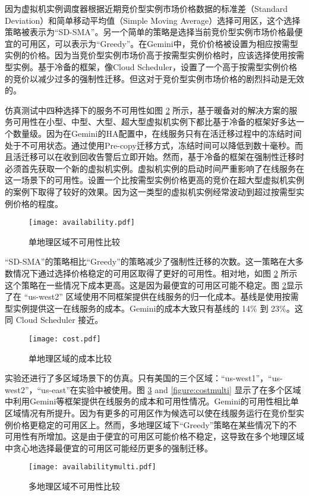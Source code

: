 因为虚拟机实例调度器根据近期竞价型实例市场价格数据的标准差（Standard Deviation）和简单移动平均值（Simple Moving Average）选择可用区，这个选择策略被表示为``SD-SMA''。另一个简单的策略是选择当前竞价型实例市场价格最便宜的可用区，可以表示为``Greedy''。在Gemini中，竞价价格被设置为相应按需型实例的价格。因为当竞价型实例市场价高于按需型实例价格时，应该选择使用按需型实例。基于冷备的框架，像Cloud Scheduler，设置了一个高于按需型实例价格的竞价以减少过多的强制性迁移。但这对于竞价型实例市场价格的剧烈抖动是无效的。

仿真测试中四种选择下的服务不可用性如图 \ref{figure:cost} 所示，基于暖备对的解决方案的服务可用性在小型、中型、大型、超大型虚拟机实例下都比基于冷备的框架好多达一个数量级。因为在Gemini的HA配置中，在线服务只有在活迁移过程中的冻结时间处于不可用状态。通过使用Pre-copy迁移方式，冻结时间可以降低到数十毫秒。而且活迁移可以在收到回收告警后立即开始。然而，基于冷备的框架在强制性迁移时必须首先获取一个新的虚拟机实例。虚拟机实例的启动时间严重影响了在线服务在这一场景下的可用性。设置一个比按需型实例价格更高的竞价在超大型虚拟机实例的案例下取得了较好的效果。因为这一类型的虚拟机实例经常波动到超过按需型实例价格的程度。
\begin{figure}[]
  \centering
  \texttt{[image: availability.pdf]}
  \caption{单地理区域不可用性比较}
  \label{figure:unavailability}
\end{figure}

``SD-SMA''的策略相比``Greedy''的策略减少了强制性迁移的次数。这一策略在大多数情况下通过选择价格稳定的可用区取得了更好的可用性。相对地，如图 \ref{figure:cost} 所示这个策略在一些情况下成本更高。这是因为最便宜的可用区可能不稳定。图 \ref{figure:cost}显示了在 ``us-west2'' 区域使用不同框架提供在线服务的归一化成本。基线是使用按需型实例提供这一在线服务的成本。Gemini的成本大致只有基线的 14\% 到 23\%。这同 Cloud Scheduler 接近。
\begin{figure}[]
  \centering
  \texttt{[image: cost.pdf]}
  \caption{单地理区域的成本比较}
  \label{figure:cost}
\end{figure}

实验还进行了多区域场景下的仿真。只有美国的三个区域：``us-west1''，``us-west2''，``us-east''在实验中被使用。图 \ref{figure:unavailabilitymulti} and \ref{figure:costmulti} 显示了在多个区域中利用Gemini等框架提供在线服务的成本和可用性情况。Gemini的可用性相比单区域情况有所提升。因为有更多的可用区作为候选可以使在线服务运行在竞价型实例价格更稳定的可用区上。然而，多地理区域下``Greedy''策略在某些情况下的不可用性有所增加。这是由于便宜的可用区可能价格不稳定，这导致在多个地理区域中贪心地选择最便宜的可用区可能经历更多的强制迁移。
\begin{figure}[]
  \centering
  \texttt{[image: availabilitymulti.pdf]}
  \caption{多地理区域不可用性比较}
  \label{figure:unavailabilitymulti}
\end{figure}

